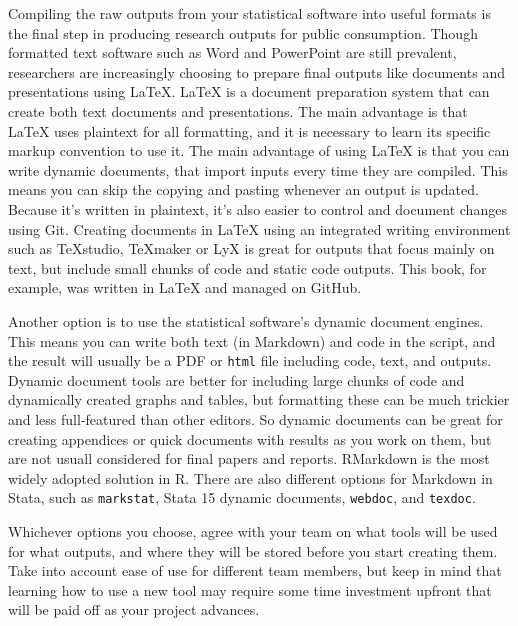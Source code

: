 Compiling the raw outputs from your statistical software into useful formats
is the final step in producing research outputs for public consumption.
Though formatted text software such as Word and PowerPoint are still prevalent,
researchers are increasingly choosing to prepare final outputs
like documents and presentations using {\LaTeX}. 
{\LaTeX} is a document preparation system that can create both text documents and presentations.
The main advantage is that {\LaTeX} uses plaintext for all formatting,
and it is necessary to learn its specific markup convention to use it.
The main advantage of using {\LaTeX} is that you can write dynamic documents,
that import inputs every time they are compiled.
This means you can skip the copying and pasting whenever an output is updated.
Because it's written in plaintext, it's also easier to control and document changes using Git.
Creating documents in {\LaTeX} using an integrated writing environment such as TeXstudio, TeXmaker or LyX
is great for outputs that focus mainly on text,
but include small chunks of code and static code outputs.
This book, for example, was written in {\LaTeX} and managed on GitHub.

Another option is to use the statistical software's dynamic document engines.
This means you can write both text (in Markdown) and code in the script,
and the result will usually be a PDF or \texttt{html} file including code, text, and outputs.
Dynamic document tools are better for including large chunks of code and dynamically created graphs and tables,
but formatting these can be much trickier and less full-featured than other editors.
So dynamic documents can be great for creating appendices
or quick documents with results as you work on them,
but are not usuall considered for final papers and reports.
RMarkdown is the most widely adopted solution in R.
There are also different options for Markdown in Stata,
such as \texttt{markstat},
Stata 15 dynamic documents,
\texttt{webdoc}, and
\texttt{texdoc}.

Whichever options you choose,
agree with your team on what tools will be used for what outputs, and
where they will be stored before you start creating them.
Take into account ease of use for different team members, but
keep in mind that learning how to use a new tool may require some
time investment upfront that will be paid off as your project advances.



